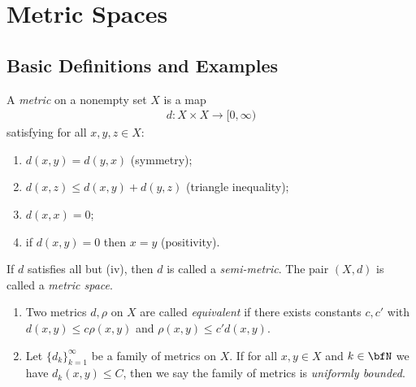 \chapter{Metric Spaces}

\section{Basic Definitions and Examples}
    \begin{definition}
        A \textit{metric} on a nonempty set $X$ is a map
            \begin{equation*}
            \begin{split}
                d: X \times X \rightarrow [0,\infty)
            \end{split}
            \end{equation*}
        satisfying for all $x,y,z \in X$:
            \begin{enumerate}[label = (\arabic*),itemsep=1pt,topsep=3pt]
                \item $d(x,y) = d(y,x)$ (symmetry);
                \item $d(x,z) \leq d(x,y) + d(y,z)$ (triangle inequality);
                \item $d(x,x) = 0$;
                \item if $d(x,y) = 0$ then $x=y$ (positivity).
            \end{enumerate}
        If $d$ satisfies all but (iv), then $d$ is called a \textit{semi-metric}. The pair $(X,d)$ is called a \textit{metric space}.
    \end{definition}

    \begin{definition}
        \phantom{a}
        \begin{enumerate}[label = (\arabic*),itemsep=1pt,topsep=3pt]
            \item Two metrics $d,\rho$ on $X$ are called \textit{equivalent} if there exists constants $c,c'$ with $d(x,y) \leq c \rho(x,y)$ and $\rho(x,y) \leq c'd(x,y)$.
            \item Let $\{d_k\}_{k=1}^\infty$ be a family of metrics on $X$. If for all $x,y \in X$ and $k \in \bfN$ we have $d_k(x,y) \leq C$, then we say the family of metrics is \textit{uniformly bounded}.
        \end{enumerate}
    \end{definition}

